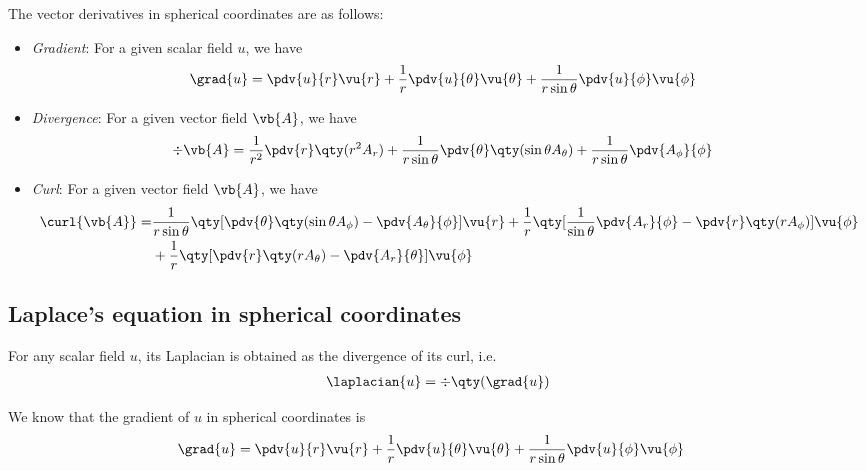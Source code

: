         The vector derivatives in spherical coordinates are as follows:
        \begin{itemize}
            \item \textit{Gradient}: For a given scalar field $u$, we have
            \begin{align*}
                \grad{u}&=\pdv{u}{r}\vu{r}+\dfrac{1}{r}\pdv{u}{\theta}\vu{\theta}+\dfrac{1}{r\sin{\theta}}\pdv{u}{\phi}\vu{\phi}
            \end{align*}

            \item \textit{Divergence}: For a given vector field $\vb{A}$, we have
            \begin{align*}
                \div{\vb{A}}&=\dfrac{1}{r^2}\pdv{r}\qty(r^2A_r)+\dfrac{1}{r\sin{\theta}}\pdv{\theta}\qty(\sin{\theta}A_\theta)+\dfrac{1}{r\sin{\theta}}\pdv{A_\phi}{\phi}
            \end{align*}

            \item \textit{Curl}: For a given vector field $\vb{A}$, we have
            \begin{align*}
                \curl{\vb{A}}=&\dfrac{1}{r\sin{\theta}}\qty[\pdv{\theta}\qty(\sin{\theta}A_\phi)-\pdv{A_\theta}{\phi}]\vu{r}+\dfrac{1}{r}\qty[\dfrac{1}{\sin{\theta}}\pdv{A_r}{\phi}-\pdv{r}\qty(rA_\phi)]\vu{\phi} \\
                &+\dfrac{1}{r}\qty[\pdv{r}\qty(rA_\theta)-\pdv{A_r}{\theta}]\vu{\phi}
            \end{align*}
        \end{itemize}

    \setcounter{equation}{0}
    \subsection{Laplace's equation in spherical coordinates}
        For any scalar field $u$, its Laplacian is obtained as the divergence of its curl, i.e.
        \begin{align}
            \laplacian{u}=\div{\qty(\grad{u})} \label{eqn:laplacian-div-grad}
        \end{align}

        We know that the gradient of $u$ in spherical coordinates is
        \begin{align}
            \grad{u}&=\pdv{u}{r}\vu{r}+\dfrac{1}{r}\pdv{u}{\theta}\vu{\theta}+\dfrac{1}{r\sin{\theta}}\pdv{u}{\phi}\vu{\phi} \label{eqn:grad-u}
        \end{align}

